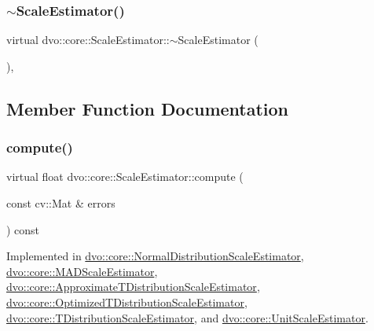 \subsubsection{\texorpdfstring{$\sim$\+Scale\+Estimator()}{~ScaleEstimator()}}
{\footnotesize\ttfamily virtual dvo\+::core\+::\+Scale\+Estimator\+::$\sim$\+Scale\+Estimator (\begin{DoxyParamCaption}{ }\end{DoxyParamCaption})\hspace{0.3cm}{\ttfamily [inline]}, {\ttfamily [virtual]}}



\subsection{Member Function Documentation}
\mbox{\label{classdvo_1_1core_1_1_scale_estimator_a6968ac2cd37c2ce1c966f0c9e17d1a3c}} 
\subsubsection{\texorpdfstring{compute()}{compute()}}
{\footnotesize\ttfamily virtual float dvo\+::core\+::\+Scale\+Estimator\+::compute (\begin{DoxyParamCaption}\item[{const cv\+::\+Mat \&}]{errors }\end{DoxyParamCaption}) const\hspace{0.3cm}{\ttfamily [pure virtual]}}



Implemented in \mbox{\hyperlink{classdvo_1_1core_1_1_normal_distribution_scale_estimator_a0aa8db7144ffcd1d06704dbf89997446}{dvo\+::core\+::\+Normal\+Distribution\+Scale\+Estimator}}, \mbox{\hyperlink{classdvo_1_1core_1_1_m_a_d_scale_estimator_a421acf5af118ef5b9c394cfd5fadea1d}{dvo\+::core\+::\+M\+A\+D\+Scale\+Estimator}}, \mbox{\hyperlink{classdvo_1_1core_1_1_approximate_t_distribution_scale_estimator_aee2b37700df1eb0125b8e0d352f7ceab}{dvo\+::core\+::\+Approximate\+T\+Distribution\+Scale\+Estimator}}, \mbox{\hyperlink{classdvo_1_1core_1_1_optimized_t_distribution_scale_estimator_ace9304a785bd16a6ef5cf4a52f3c6299}{dvo\+::core\+::\+Optimized\+T\+Distribution\+Scale\+Estimator}}, \mbox{\hyperlink{classdvo_1_1core_1_1_t_distribution_scale_estimator_a0ed88ffeb9b71110e3ae69b681526bc4}{dvo\+::core\+::\+T\+Distribution\+Scale\+Estimator}}, and \mbox{\hyperlink{classdvo_1_1core_1_1_unit_scale_estimator_a7578f9008f25d96250c20ff3080673ed}{dvo\+::core\+::\+Unit\+Scale\+Estimator}}.

